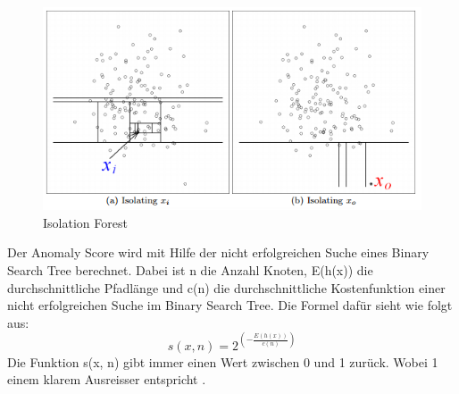 \begin{figure}[ht]
\centering
\includegraphics[width=\textwidth]{images/isolation_forest.png}
\caption[Isolation Forest]{Isolation Forest}%
\label{fig:isolation_forest}
\end{figure}
%
Der Anomaly Score wird mit Hilfe der nicht erfolgreichen Suche eines Binary Search Tree berechnet. Dabei ist n die Anzahl Knoten, E(h(x)) die durchschnittliche Pfadlänge und c(n) die durchschnittliche Kostenfunktion einer nicht erfolgreichen Suche im Binary Search Tree. Die Formel dafür sieht wie folgt aus:
\begin{equation}
\label{eq:isolation}
s(x, n) = 2^(-\frac{E(h(x))}{c(n)})
\end{equation}
\newline
Die Funktion s(x, n) gibt immer einen Wert zwischen 0 und 1 zurück. Wobei 1 einem klarem Ausreisser entspricht \cite{isolation_forest_2}.